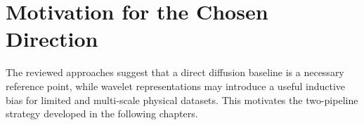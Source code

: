 \section{Motivation for the Chosen Direction}

The reviewed approaches suggest that a direct diffusion baseline is a necessary reference point, while wavelet representations may introduce a useful inductive bias for limited and multi-scale physical datasets. This motivates the two-pipeline strategy developed in the following chapters.
